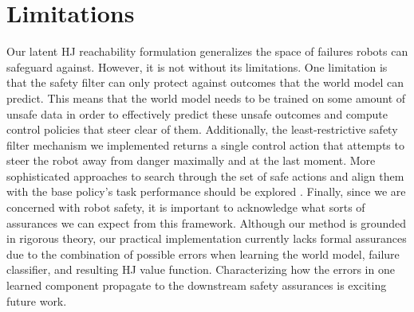 \section{Limitations}
Our latent HJ reachability formulation generalizes the space of failures robots can safeguard against.
However, it is not without its limitations. 
One limitation is that the safety filter can only protect against outcomes that the world model can predict.
This means that the world model needs to be trained on some amount of unsafe data in order to effectively predict these unsafe outcomes and compute control policies that steer clear of them. %
Additionally, the least-restrictive safety filter mechanism we implemented returns a single control action that attempts to steer the robot away from danger maximally and at the last moment. 
More sophisticated approaches to search through the set of safe actions and align them with the base policy's task performance should be explored  \cite{hsu2023safety, wabersich2023data}. 
Finally, since we are concerned with robot safety, it is important to acknowledge what sorts of assurances we can expect from this framework. 
Although our method is grounded in rigorous theory, our practical implementation currently lacks formal assurances due to the combination of possible errors when learning the world model, failure classifier, and resulting HJ value function. Characterizing how the errors in one learned component propagate to the downstream safety assurances is exciting future work.


